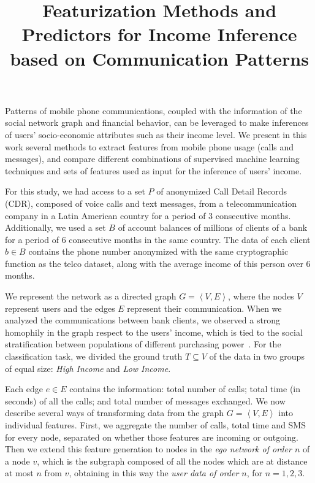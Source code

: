 \documentclass[conference,onecolumn]{IEEEtran}
\title{Featurization Methods and Predictors for Income Inference based on Communication Patterns}
\author{%
\IEEEauthorblockN{%
	Martin Fixman\IEEEauthorrefmark{1}\IEEEauthorrefmark{2},
	Martin Minnoni\IEEEauthorrefmark{2},
	Matias Travizano\IEEEauthorrefmark{2},
	Carlos Sarraute\IEEEauthorrefmark{2}
}
\IEEEauthorblockA{\IEEEauthorrefmark{1}Universidad de Buenos Aires, Argentina}
\IEEEauthorblockA{\IEEEauthorrefmark{2}Grandata Labs, 550 15th Street, San Francisco, CA, USA}
\IEEEauthorblockA{Email: martinfixman@gmail.com, \{martin, mat, charles\}@grandata.com}
}
\begin{document}
\maketitle

Patterns of mobile phone communications, coupled with the information of the social network graph and financial behavior, can be leveraged to make inferences of users' socio-economic attributes such as their income level. We present in this work several methods to extract features from mobile phone usage (calls and messages), and compare different combinations of supervised machine learning techniques and sets of features used as input for the inference of users' income. 

For this study, we had access to a set $P$ of anonymized Call Detail Records (CDR), composed of voice calls and text messages, from a telecommunication company in a Latin American country for a period of 3 consecutive months. Additionally, we used a set $B$ of account balances of millions of clients of a bank for a period of 6 consecutive months in the same country. 
The data of each client $b \in B$ contains the phone number anonymized with the same cryptographic function as the telco dataset, along with the average income of this person over 6 months.

We represent the network as a directed graph $G = \left< V, E \right>$, where the nodes $V$ represent users and the edges $E$ represent their communication. When we analyzed the communications between bank clients, we observed a strong homophily in the graph respect to the users' income, which is tied to the social stratification between populations of different purchasing power~\cite{fixmanasonam2016}.
For the classification task, we divided the ground truth $T \subseteq V$ of the data in two  groups of equal size: \emph{High Income} and \emph{Low Income}.

Each edge $e \in E$ contains the information: total number of calls; total time (in seconds) of all the calls; and total number of messages exchanged.
We now describe several ways of transforming data from the graph $G = \left< V, E \right>$ into individual features.
First, we aggregate the number of calls, total time and SMS for every node, separated on whether those features are incoming or outgoing.
Then we extend this feature generation to nodes in the \emph{ego network of order $n$} of a node $v$, which is the subgraph composed of all the nodes which are at distance at most $n$ from $v$, obtaining in this way the \emph{user data of order $n$}, for $n = 1, 2, 3$.
\end{document}
